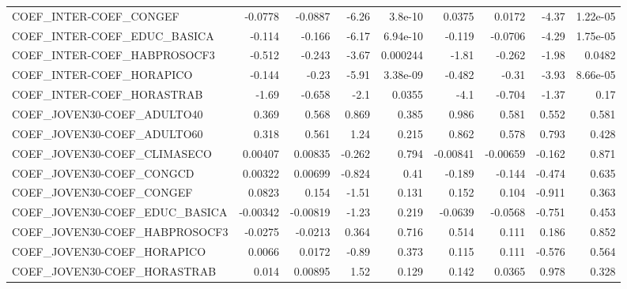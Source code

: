 \begin{tabular}{lrrrrrrrr}
COEF\_INTER-COEF\_CONGEF                 &     -0.0778 &      -0.0887 &    -6.26 &  3.8e-10 &     0.0375 &      0.0172 &        -4.37 &      1.22e-05 \\
COEF\_INTER-COEF\_EDUC\_BASICA            &      -0.114 &       -0.166 &    -6.17 & 6.94e-10 &     -0.119 &     -0.0706 &        -4.29 &      1.75e-05 \\
COEF\_INTER-COEF\_HABPROSOCF3            &      -0.512 &       -0.243 &    -3.67 & 0.000244 &      -1.81 &      -0.262 &        -1.98 &        0.0482 \\
COEF\_INTER-COEF\_HORAPICO               &      -0.144 &        -0.23 &    -5.91 & 3.38e-09 &     -0.482 &       -0.31 &        -3.93 &      8.66e-05 \\
COEF\_INTER-COEF\_HORASTRAB              &       -1.69 &       -0.658 &     -2.1 &   0.0355 &       -4.1 &      -0.704 &        -1.37 &          0.17 \\
COEF\_JOVEN30-COEF\_ADULTO40             &       0.369 &        0.568 &    0.869 &    0.385 &      0.986 &       0.581 &        0.552 &         0.581 \\
COEF\_JOVEN30-COEF\_ADULTO60             &       0.318 &        0.561 &     1.24 &    0.215 &      0.862 &       0.578 &        0.793 &         0.428 \\
COEF\_JOVEN30-COEF\_CLIMASECO            &     0.00407 &      0.00835 &   -0.262 &    0.794 &   -0.00841 &    -0.00659 &       -0.162 &         0.871 \\
COEF\_JOVEN30-COEF\_CONGCD               &     0.00322 &      0.00699 &   -0.824 &     0.41 &     -0.189 &      -0.144 &       -0.474 &         0.635 \\
COEF\_JOVEN30-COEF\_CONGEF               &      0.0823 &        0.154 &    -1.51 &    0.131 &      0.152 &       0.104 &       -0.911 &         0.363 \\
COEF\_JOVEN30-COEF\_EDUC\_BASICA          &    -0.00342 &     -0.00819 &    -1.23 &    0.219 &    -0.0639 &     -0.0568 &       -0.751 &         0.453 \\
COEF\_JOVEN30-COEF\_HABPROSOCF3          &     -0.0275 &      -0.0213 &    0.364 &    0.716 &      0.514 &       0.111 &        0.186 &         0.852 \\
COEF\_JOVEN30-COEF\_HORAPICO             &      0.0066 &       0.0172 &    -0.89 &    0.373 &      0.115 &       0.111 &       -0.576 &         0.564 \\
COEF\_JOVEN30-COEF\_HORASTRAB            &       0.014 &      0.00895 &     1.52 &    0.129 &      0.142 &      0.0365 &        0.978 &         0.328 \\

\end{tabular}
